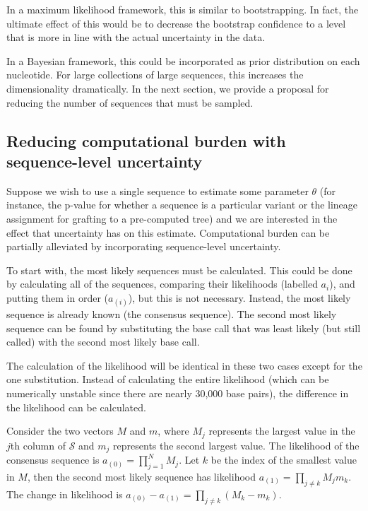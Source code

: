 \documentclass[
]{article}
\newcommand{\nps}{\mathcal{S}} %
\begin{document}
In a maximum likelihood framework, this is similar to bootstrapping. In
fact, the ultimate effect of this would be to decrease the bootstrap
confidence to a level that is more in line with the actual uncertainty
in the data.

In a Bayesian framework, this could be incorporated as prior
distribution on each nucleotide. For large collections of large
sequences, this increases the dimensionality dramatically. In the next
section, we provide a proposal for reducing the number of sequences that
must be sampled.

\hypertarget{reducing-computational-burden-with-sequence-level-uncertainty}{%
\subsection{Reducing computational burden with sequence-level
uncertainty}\label{reducing-computational-burden-with-sequence-level-uncertainty}}

Suppose we wish to use a single sequence to estimate some parameter
\(\theta\) (for instance, the p-value for whether a sequence is a
particular variant or the lineage assignment for grafting to a
pre-computed tree) and we are interested in the effect that uncertainty
has on this estimate. Computational burden can be partially alleviated
by incorporating sequence-level uncertainty.

To start with, the most likely sequences must be calculated. This could
be done by calculating all of the sequences, comparing their likelihoods
(labelled \(a_i\)), and putting them in order (\(a_{(i)}\)), but this is
not necessary. Instead, the most likely sequence is already known (the
consensus sequence). The second most likely sequence can be found by
substituting the base call that was least likely (but still called) with
the second most likely base call.

The calculation of the likelihood will be identical in these two cases
except for the one substitution. Instead of calculating the entire
likelihood (which can be numerically unstable since there are nearly
30,000 base pairs), the difference in the likelihood can be calculated.

Consider the two vectors \(M\) and \(m\), where \(M_j\) represents the
largest value in the \(j\)th column of \(\nps\) and \(m_j\) represents
the second largest value. The likelihood of the consensus sequence is
\(a_{(0)} = \prod_{j=1}^NM_j\). Let \(k\) be the index of the smallest
value in \(M\), then the second most likely sequence has likelihood
\(a_{(1)} = \prod_{j\ne k}M_jm_k\). The change in likelihood is
\(a_{(0)} - a_{(1)} = \prod_{j\ne k}(M_k - m_k)\).
\end{document}
